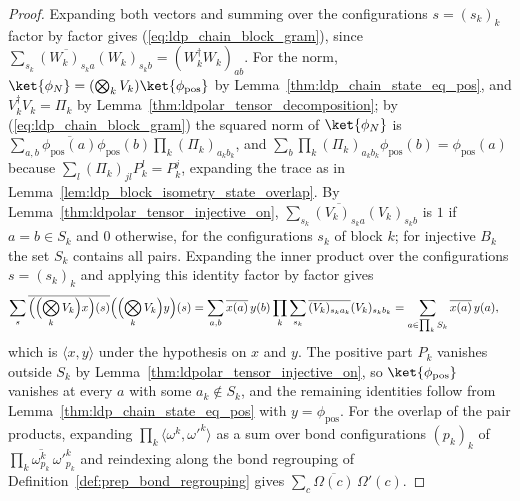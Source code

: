 \begin{proof}
    \leanok
    Expanding both vectors and summing over the configurations $s=(s_k)_k$
    factor by factor gives (\ref{eq:ldp_chain_block_gram}), since
    $\sum_{s_k}\overline{(W_k)_{s_ka}}(W_k)_{s_kb}=(W_k^\dagger W_k)_{ab}$. For
    the norm, $\ket{\phi_N}=(\bigotimes_kV_k)\ket{\phi_{\mathrm{pos}}}$ by
    Lemma~\ref{thm:ldp_chain_state_eq_pos}, and
    $V_k^\dagger V_k=\Pi_k$ by Lemma~\ref{thm:ldpolar_tensor_decomposition};
    by (\ref{eq:ldp_chain_block_gram}) the squared norm of $\ket{\phi_N}$ is
    $\sum_{a,b}\overline{\phi_{\mathrm{pos}}(a)}\phi_{\mathrm{pos}}(b)
        \prod_k(\Pi_k)_{a_kb_k}$, and
    $\sum_b\prod_k(\Pi_k)_{a_kb_k}\phi_{\mathrm{pos}}(b)=\phi_{\mathrm{pos}}(a)$
    because $\sum_l(\Pi_k)_{jl}P_k^l=P_k^j$, expanding the trace as in
    Lemma~\ref{lem:ldp_block_isometry_state_overlap}.
    By Lemma~\ref{thm:ldpolar_tensor_injective_on},
    $\sum_{s_k}\overline{(V_k)_{s_ka}}(V_k)_{s_kb}$ is $1$ if $a=b\in S_k$ and
    $0$ otherwise, for the configurations $s_k$ of block $k$; for injective
    $B_k$ the set $S_k$ contains all pairs. Expanding the inner product over
    the configurations $s=(s_k)_k$ and applying this identity factor by factor
    gives
    \begin{align}
        \sum_s\overline{\Bigl(\Bigl(\bigotimes_kV_k\Bigr)x\Bigr)(s)}
        \Bigl(\Bigl(\bigotimes_kV_k\Bigr)y\Bigr)(s)
         & =\sum_{a,b}\overline{x(a)}\,y(b)
        \prod_k\sum_{s_k}\overline{(V_k)_{s_ka_k}}(V_k)_{s_kb_k}
        =\sum_{a\in\prod_kS_k}\overline{x(a)}\,y(a),
        \notag
    \end{align}
    which is $\langle x,y\rangle$ under the hypothesis on $x$ and $y$. The
    positive part $P_k$ vanishes outside $S_k$ by
    Lemma~\ref{thm:ldpolar_tensor_injective_on}, so
    $\ket{\phi_{\mathrm{pos}}}$ vanishes at every $a$ with some $a_k\notin S_k$,
    and the remaining identities follow from
    Lemma~\ref{thm:ldp_chain_state_eq_pos} with $y=\phi_{\mathrm{pos}}$. For
    the overlap of the pair products, expanding
    $\prod_k\langle\omega^k,\omega'^k\rangle$ as a sum over bond
    configurations $(p_k)_k$ of $\prod_k\overline{\omega^k_{p_k}}\,\omega'^k_{p_k}$
    and reindexing along the bond regrouping of
    Definition~\ref{def:prep_bond_regrouping} gives
    $\sum_c\overline{\Omega(c)}\,\Omega'(c)$.
\end{proof}

